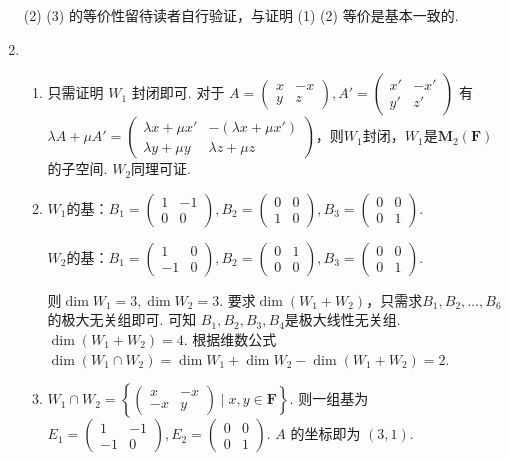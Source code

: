 \begin{enumerate}
          (2) (3) 的等价性留待读者自行验证，与证明 (1) (2) 等价是基本一致的.

    \item \begin{enumerate}
              \item 只需证明 $W_1$ 封闭即可. 对于 $A=\begin{pmatrix}x & -x \\ y & z\end{pmatrix},A'=\begin{pmatrix} x' & -x' \\ y' & z' \end{pmatrix}$ 有 $\lambda A+\mu A'=\begin{pmatrix}
                            \lambda x+\mu x' & -(\lambda x+\mu x') \\
                            \lambda y+\mu y  & \lambda z+\mu z
                        \end{pmatrix}$，则$W_1$封闭，$W_1$是$\mathbf{M}_2(\mathbf{F})$的子空间.	$W_2$同理可证.

              \item $W_1$的基：$B_1=\begin{pmatrix}1&-1\\0&0\end{pmatrix},B_2=\begin{pmatrix}0&0\\1&0\end{pmatrix},B_3=\begin{pmatrix}0&0\\0&1\end{pmatrix}$.

                    $W_2$的基：$B_1=\begin{pmatrix}1&0\\-1&0\end{pmatrix},B_2=\begin{pmatrix}0&1\\0&0\end{pmatrix},B_3=\begin{pmatrix}0&0\\0&1\end{pmatrix}$.

                    则$\dim W_1=3,\dim W_2=3$. 要求$\dim  (W_1+W_2)$，只需求$B_1,B_2,\ldots ,B_6$的极大无关组即可. 可知 $B_1,B_2,B_3,B_4$是极大线性无关组.	$\dim(W_1+W_2)=4$. 根据维数公式$\dim (W_1\cap W_2)=\dim W_1+\dim W_2-\dim (W_1+W_2)=2$.

              \item $W_1\cap W_2=\left\{\begin{pmatrix}x&-x\\-x&y\end{pmatrix} \mid x,y\in \mathbf{F}\right\}$. 则一组基为$E_1=\begin{pmatrix}1&-1\\-1&0\end{pmatrix},E_2=\begin{pmatrix}0&0\\0&1\end{pmatrix}$. $A$ 的坐标即为 $(3,1)$.
          \end{enumerate}


\end{enumerate}
